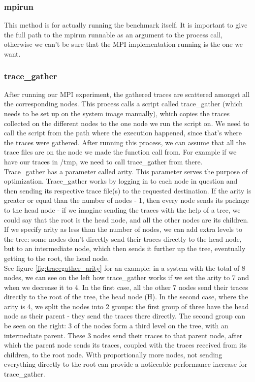 \subsubsection{mpirun}
This method is for actually running the benchmark
itself. It is important to give the full path to the mpirun runnable
as an argument to the process call, otherwise we can't be sure that
the MPI implementation running is the one we want.
\subsubsection{trace\_gather}
\label{sec:trace_gather}
After running our MPI experiment, the gathered traces are scattered
amongst all the corresponding nodes. This process calls a script
called trace\_gather\cite{ms11} (which needs to be set up on the system
image manually), which copies the traces collected on the
different nodes to the one node we run the script on. We need to call
the script from the path where the execution happened, since that's
where the traces were gathered. After running
this process, we can assume that all the trace files are on the node
we made the function call from. For example if we have our traces in
/tmp, we need to call trace\_gather from there.\\[0.3cm]
Trace\_gather has a parameter called arity. This parameter serves the
purpose of optimization. Trace\_gather
works by logging in to each node in question and then sending its
respective trace file(s) to the requested destination. If the arity is
greater or equal than the number of nodes - 1, then every node sends
its package to the head node - if we imagine sending the traces with
the help of a tree, we could say that the root is the head node, and
all the other nodes are its children. If we specify arity as less than
the number of nodes, we can add extra levels to the tree: some nodes
don't directly send their traces directly to the head node, but to an
intermediate node, which then sends it further up the tree, eventually
getting to the root, the head node.\\[0.3cm]
See figure \ref{fig:tracegather_arity} for an example: in a system
with the total of 8 nodes, we can see on the left how trace\_gather
works if we set the arity to 7 and when we decrease it to 4. In the
first case, all the other 7 nodes send their traces directly to the
root of the tree, the head node (H). In the second case, where the
arity is 4, we split the nodes into 2 groups: the first group of three
have the head node as their parent - they send the traces there
directly. The second group can be seen on the right: 3 of the nodes
form a third level on the tree, with an intermediate parent. These 3
nodes send their traces to that parent node, after which the parent
node sends its traces, coupled with the traces received from its
children, to the root node. With proportionally more nodes, not
sending everything directly to the root can provide a noticeable
performance increase for trace\_gather.

